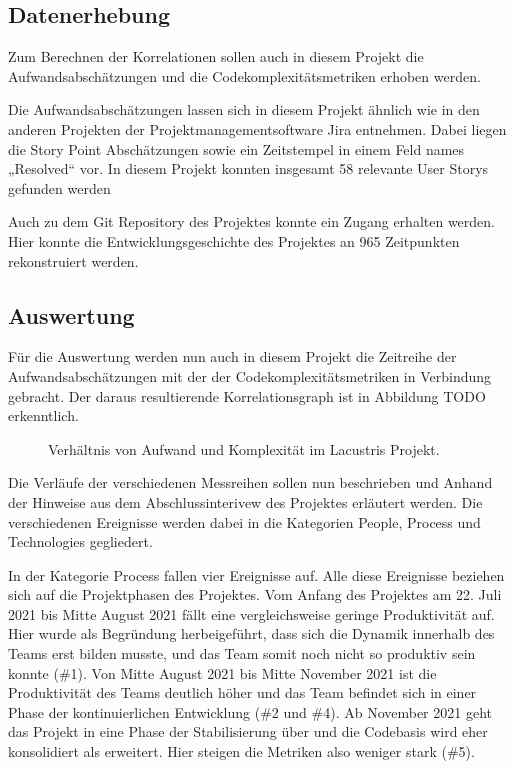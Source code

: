 \subsection{Datenerhebung}\label{lm-Datenerhebung}

Zum Berechnen der Korrelationen sollen auch in diesem Projekt die
Aufwandsabschätzungen und die Codekomplexitätsmetriken erhoben werden.

Die Aufwandsabschätzungen lassen sich in diesem Projekt ähnlich wie in
den anderen Projekten der Projektmanagementsoftware Jira entnehmen.
Dabei liegen die Story Point Abschätzungen sowie ein Zeitstempel in
einem Feld names „Resolved`` vor. In diesem Projekt konnten insgesamt 58
relevante User Storys gefunden werden

Auch zu dem Git Repository des Projektes konnte ein Zugang erhalten
werden. Hier konnte die Entwicklungsgeschichte des Projektes an 965
Zeitpunkten rekonstruiert werden.

\subsection{Auswertung}\label{lm-Auswertung}

Für die Auswertung werden nun auch in diesem Projekt die Zeitreihe der
Aufwandsabschätzungen mit der der Codekomplexitätsmetriken in Verbindung
gebracht. Der daraus resultierende Korrelationsgraph ist in Abbildung TODO
erkenntlich.

\begin{figure}\label{lacustris-graph}
  \begin{center}
      
  \end{center}
  \caption{Verhältnis von Aufwand und Komplexität im Lacustris Projekt.}
\end{figure}


Die Verläufe der verschiedenen Messreihen sollen nun beschrieben und
Anhand der Hinweise aus dem Abschlussinterivew des Projektes erläutert
werden. Die verschiedenen Ereignisse werden dabei in die Kategorien
People, Process und Technologies gegliedert.

In der Kategorie Process fallen vier Ereignisse auf. Alle diese
Ereignisse beziehen sich auf die Projektphasen des Projektes. Vom Anfang
des Projektes am 22. Juli 2021 bis Mitte August 2021 fällt eine
vergleichsweise geringe Produktivität auf. Hier wurde als Begründung
herbeigeführt, dass sich die Dynamik innerhalb des Teams erst bilden
musste, und das Team somit noch nicht so produktiv sein konnte (\#1). Von Mitte August 2021 bis Mitte
November 2021 ist die Produktivität des Teams deutlich höher und das
Team befindet sich in einer Phase der kontinuierlichen Entwicklung (\#2
und \#4). Ab November 2021
geht das Projekt in eine Phase der Stabilisierung über und die Codebasis
wird eher konsolidiert als erweitert. Hier steigen die Metriken also
weniger stark (\#5).

